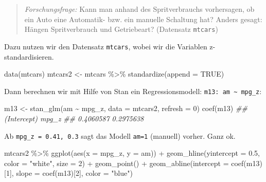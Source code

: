 \documentclass[
  a4paper,
  DIV=11]{scrreprt}
\newenvironment{Shaded}{\begin{snugshade}}{\end{snugshade}}
\newcommand{\AttributeTok}[1]{\textcolor[rgb]{0.40,0.45,0.13}{#1}}
\newcommand{\ConstantTok}[1]{\textcolor[rgb]{0.56,0.35,0.01}{#1}}
\newcommand{\DecValTok}[1]{\textcolor[rgb]{0.68,0.00,0.00}{#1}}
\newcommand{\DocumentationTok}[1]{\textcolor[rgb]{0.37,0.37,0.37}{\textit{#1}}}
\newcommand{\FloatTok}[1]{\textcolor[rgb]{0.68,0.00,0.00}{#1}}
\newcommand{\FunctionTok}[1]{\textcolor[rgb]{0.28,0.35,0.67}{#1}}
\newcommand{\NormalTok}[1]{\textcolor[rgb]{0.00,0.23,0.31}{#1}}
\newcommand{\OtherTok}[1]{\textcolor[rgb]{0.00,0.23,0.31}{#1}}
\newcommand{\SpecialCharTok}[1]{\textcolor[rgb]{0.37,0.37,0.37}{#1}}
\newcommand{\StringTok}[1]{\textcolor[rgb]{0.13,0.47,0.30}{#1}}
\theoremstyle{definition}
\theoremstyle{remark}
\begin{document}
\begin{quote}
\emph{Forschungsfrage:} Kann man anhand des Spritverbrauchs vorhersagen,
ob ein Auto eine Automatik- bzw. ein manuelle Schaltung hat? Anders
gesagt: Hängen Spritverbrauch und Getriebeart? (Datensatz
\texttt{mtcars})
\end{quote}

Dazu nutzen wir den Datensatz \texttt{mtcars}, wobei wir die Variablen
z-standardisieren.

\begin{Shaded}
\begin{Highlighting}[]
\FunctionTok{data}\NormalTok{(mtcars)}
\NormalTok{mtcars2 }\OtherTok{\textless{}{-}}
\NormalTok{  mtcars }\SpecialCharTok{\%\textgreater{}\%} 
  \FunctionTok{standardize}\NormalTok{(}\AttributeTok{append =} \ConstantTok{TRUE}\NormalTok{)}
\end{Highlighting}
\end{Shaded}

Dann berechnen wir mit Hilfe von Stan ein Regressionsmodell:
\texttt{m13:\ am\ \textasciitilde{}\ mpg\_z}:

\begin{Shaded}
\begin{Highlighting}[]
\NormalTok{m13 }\OtherTok{\textless{}{-}}
  \FunctionTok{stan\_glm}\NormalTok{(am }\SpecialCharTok{\textasciitilde{}}\NormalTok{ mpg\_z, }
           \AttributeTok{data =}\NormalTok{ mtcars2, }
           \AttributeTok{refresh =} \DecValTok{0}\NormalTok{)}
\FunctionTok{coef}\NormalTok{(m13)}
\DocumentationTok{\#\# (Intercept)       mpg\_z }
\DocumentationTok{\#\#   0.4060587   0.2975638}
\end{Highlighting}
\end{Shaded}

Ab \texttt{mpg\_z\ =\ 0.41,\ 0.3} sagt das Modell \texttt{am=1}
(manuell) vorher. Ganz ok.

\begin{Shaded}
\begin{Highlighting}[]
\NormalTok{mtcars2 }\SpecialCharTok{\%\textgreater{}\%} 
  \FunctionTok{ggplot}\NormalTok{(}\FunctionTok{aes}\NormalTok{(}\AttributeTok{x =}\NormalTok{ mpg\_z, }\AttributeTok{y =}\NormalTok{ am)) }\SpecialCharTok{+}
  \FunctionTok{geom\_hline}\NormalTok{(}\AttributeTok{yintercept =} \FloatTok{0.5}\NormalTok{, }\AttributeTok{color =} \StringTok{"white"}\NormalTok{, }\AttributeTok{size =} \DecValTok{2}\NormalTok{) }\SpecialCharTok{+}
  \FunctionTok{geom\_point}\NormalTok{() }\SpecialCharTok{+}
  \FunctionTok{geom\_abline}\NormalTok{(}\AttributeTok{intercept =} \FunctionTok{coef}\NormalTok{(m13)[}\DecValTok{1}\NormalTok{],}
              \AttributeTok{slope =} \FunctionTok{coef}\NormalTok{(m13)[}\DecValTok{2}\NormalTok{],}
              \AttributeTok{color =} \StringTok{"blue"}\NormalTok{) }
\end{Highlighting}
\end{Shaded}
\end{document}

